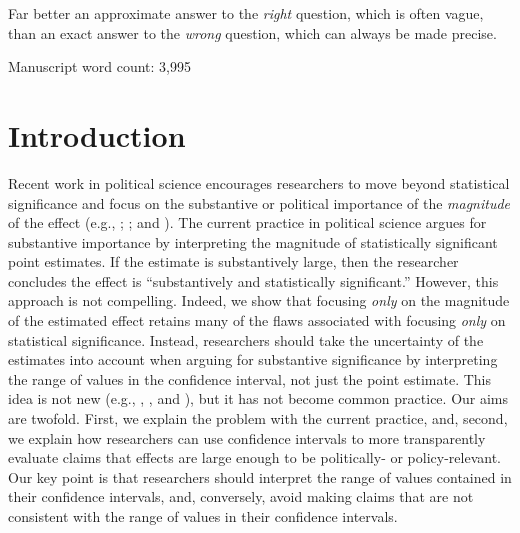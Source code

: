 \documentclass[12pt]{article}
\begin{document}
\epigraph{Far better an approximate answer to the \textit{right} question, which is often vague, than an exact answer to the \textit{wrong} question, which can always be made precise.}{\citet[pp. 13-14]{Tukey1962}}

\begin{center}
Manuscript word count: 3,995
\end{center}

\thispagestyle{empty}

\newpage
\doublespace

\section*{Introduction}

Recent work in political science encourages researchers to move beyond statistical significance and focus on the substantive or political importance of the \emph{magnitude} of the effect (e.g., \citealt{KingTomzWittenberg2000}; \citealt{HanmerKalkan2013}; and \citealt{EsareyDanneman2014}). The current practice in political science argues for substantive importance by interpreting the magnitude of statistically significant point estimates. If the estimate is substantively large, then the researcher concludes the effect is ``substantively and statistically significant.'' However, this approach is not compelling. Indeed, we show that focusing \emph{only} on the magnitude of the estimated effect retains many of the flaws associated with focusing \emph{only} on statistical significance. Instead, researchers should take the uncertainty of the estimates into account when arguing for substantive significance by interpreting the range of values in the confidence interval, not just the point estimate. This idea is not new (e.g., \citealt{Achen1982}, \citealt{Gross2014}, and \citealt{Rainey2014}), but it has not become common practice. Our aims are twofold. First, we explain the problem with the current practice, and, second, we explain how researchers can use confidence intervals to more transparently evaluate claims that effects are large enough to be politically- or policy-relevant. Our key point is that researchers should interpret the range of values contained in their confidence intervals, and, conversely, avoid making claims that are not consistent with the range of values in their confidence intervals.
\end{document}
